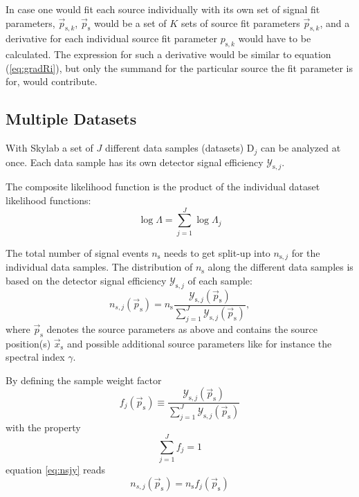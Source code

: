 \documentclass{article}
\newcommand{\ns}{n_{\mathrm{s}}}
\newcommand{\ps}{\vec{p}_{\mathrm{s}}}
\newcommand{\xs}{\vec{x}_{\mathrm{s}}}
\begin{document}
In case one would fit each source individually with its own set of signal fit
parameters, $\vec{p}_{\mathrm{s},k}$, $\ps$ would be a set of $K$ sets
of source fit parameters $\vec{p}_{\mathrm{s},k}$, and a derivative for each
individual source fit parameter $p_{\mathrm{s},k}$ would have to be calculated.
The expression for such a derivative would be similar to equation (\ref{eq:gradRi}),
but only the summand for the particular source the fit parameter is for, would
contribute.


\subsection{Multiple Datasets}

With Skylab a set of $J$ different data samples (datasets) $\mathrm{D}_j$ can be
analyzed at once. Each data sample has its own detector signal efficiency
$\mathcal{Y}_{\mathrm{s},j}$.

The composite likelihood function is the product of the individual dataset
likelihood functions:
\begin{equation}
 \log \Lambda = \sum_{j=1}^{J} \log \Lambda_j
 \label{eq:logLambdaComposite}
\end{equation}

The total number of signal events $\ns$ needs to get split-up into
$n_{\mathrm{s},j}$ for the individual data samples. The distribution of $\ns$
along the different data samples is based on the detector signal efficiency
$\mathcal{Y}_{\mathrm{s},j}$ of each sample:
\begin{equation}
 n_{s,j}(\ps) = \ns \frac{\mathcal{Y}_{\mathrm{s},j}(\ps)}{\sum_{j=1}^{J} \mathcal{Y}_{\mathrm{s},j}(\ps)},
 \label{eq:nsjy}
\end{equation}
where $\ps$ denotes the source parameters as above and contains the source
position(s) $\xs$ and possible additional source parameters like
for instance the spectral index $\gamma$.

By defining the sample weight factor
\begin{equation}
 f_j(\ps) \equiv \frac{\mathcal{Y}_{\mathrm{s},j}(\ps)}{\sum_{j=1}^{J} \mathcal{Y}_{\mathrm{s},j}(\ps)}
\end{equation}
with the property
\begin{equation}
 \sum_{j=1}^{J} f_j = 1
\end{equation}
equation \ref{eq:nsjy} reads
\begin{equation}
 n_{s,j}(\ps) = \ns f_{j}(\ps)
 \label{eq:ns-sample-weight-factor}
\end{equation}
\end{document}

